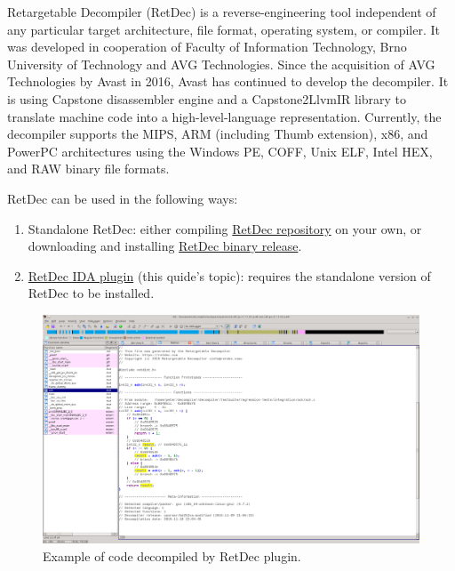 \documentclass[pdftex, a4paper,12pt, oneside, svgnames]{article}
\begin{document}
Retargetable Decompiler (RetDec) is a reverse-engineering tool independent of any particular target architecture, file format, operating system, or compiler. It was developed in cooperation of Faculty of Information Technology, Brno University of Technology and AVG Technologies. Since the acquisition of AVG Technologies by Avast in 2016, Avast has continued to develop the decompiler. It is using Capstone disassembler engine and a Capstone2LlvmIR library to translate machine code into a high-level-language representation. Currently, the decompiler supports the MIPS, ARM (including Thumb extension), x86, and PowerPC architectures using the Windows PE, COFF, Unix ELF, Intel HEX, and RAW binary file formats.

RetDec can be used in the following ways:
\begin{enumerate}
	\item Standalone RetDec: either compiling \href{https://github.com/avast-tl/retdec}{RetDec repository} on your own, or downloading and installing \href{https://github.com/avast-tl/retdec/releases}{RetDec binary release}.
	\item \href{https://retdec.com/idaplugin/}{RetDec IDA plugin} (this quide's topic): requires the standalone version of RetDec to be installed.
\end{enumerate}

\begin{figure}[!ht]
	\centering
	\includegraphics[width=\textwidth]{figures/overview}
	\caption{Example of code decompiled by RetDec plugin.}
	\label{fig:overview}
\end{figure}

\newpage
\end{document}

